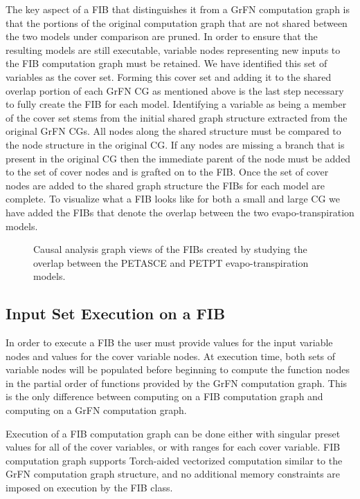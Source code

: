 The key aspect of a FIB that distinguishes it from a GrFN computation graph is that the portions of the original computation graph that are not shared between the two models under comparison are pruned.
In order to ensure that the resulting models are still executable, variable nodes representing new inputs to the FIB computation graph must be retained.
We have identified this set of variables as the cover set.
Forming this cover set and adding it to the shared overlap portion of each GrFN CG as mentioned above is the last step necessary to fully create the FIB for each model.
Identifying a variable as being a member of the cover set stems from the initial shared graph structure extracted from the original GrFN CGs.
All nodes along the shared structure must be compared to the node structure in the original CG.
If any nodes are missing a branch that is present in the original CG then the immediate parent of the node must be added to the set of cover nodes and is grafted on to the FIB.
Once the set of cover nodes are added to the shared graph structure the FIBs for each model are complete.
To visualize what a FIB looks like for both a small and large CG we have added the FIBs that denote the overlap between the two evapo-transpiration models.

\FloatBarrier
\begin{figure}[!htbp]
    \label{fib_viz}
    \centering
    \caption[FIB Visualizations]{Causal analysis graph views of the FIBs created by studying the overlap between the PETASCE and PETPT evapo-transpiration models.}
\end{figure}
\FloatBarrier

\subsection{Input Set Execution on a FIB\label{sec:fib_exec}}
In order to execute a FIB the user must provide values for the input variable nodes and values for the cover variable nodes. At execution time, both sets of variable nodes will be populated before beginning to compute the function nodes in the partial order of functions provided by the GrFN computation graph. This is the only difference between computing on a FIB computation graph and computing on a GrFN computation graph.

Execution of a FIB computation graph can be done either with singular preset values for all of the cover variables, or with ranges for each cover variable. FIB computation graph supports Torch-aided vectorized computation similar to the GrFN computation graph structure, and no additional memory constraints are imposed on execution by the FIB class.
